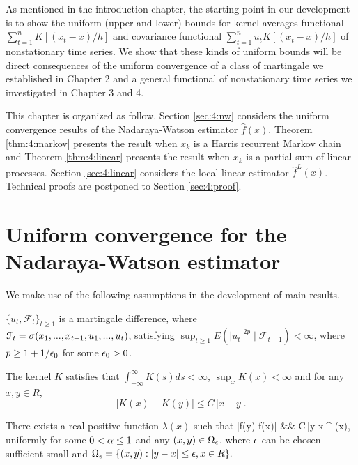 As mentioned in the introduction chapter, the starting point in our development is to show the uniform (upper and lower) bounds for kernel averages functional $\sum_{t=1}^{n}K[(x_{t}-x)/h]$ and covariance functional $\sum_{t=1}^{n}u_t K[(x_{t}-x)/h]$ of nonstationary time series. We show that these kinds of uniform bounds will be direct consequences of the uniform convergence of a class of martingale we established in Chapter 2 and a general functional of nonstationary time series we investigated in Chapter 3 and 4. 


This chapter is organized as follow. Section \ref{sec:4:nw} considers the uniform convergence results of  the Nadaraya-Watson estimator $\widehat{f}(x)$. Theorem \ref{thm:4:markov} presents the result when $x_k$ is a Harris recurrent Markov chain and Theorem \ref{thm:4:linear} presents the result when $x_k$ is a partial sum of linear processes. Section \ref{sec:4:linear} considers the local linear estimator $\widehat{f}^L(x)$. Technical proofs are postponed to Section \ref{sec:4:proof}.

\section{Uniform convergence for the Nadaraya-Watson estimator} 
We make use of the following assumptions in the development of main results.

\begin{assump} 
 $\{u_t, {\mathcal F}_t\}_{t\ge 1}$ is a martingale difference, where\\ ${\mathcal F}_t=\sigma (x_1, ..., x_{t+1}, u_1,...,u_t)$, satisfying $ \sup_{t\ge 1}E(|u_t|^{2p}\mid {\mathcal F}_{t-1})<\infty$, where  $p\ge 1+1/\epsilon_0$ for some $\epsilon_0>0$.
 \end{assump}

\begin{assump} 
The kernel $K$ satisfies that $\int_{-\infty}^{\infty}K(s)ds<\infty$, $\sup_xK(x)<\infty$
 and for any $x, y \in R$, $$ |K(x)-K(y)| \le C\, |x-y|. $$
\end{assump}

\begin{assump} 
There exists a real positive function $\lambda(x)$ such that
\bestar
|f(y)-f(x)| &\leq& C\,|y-x|^{\alpha} \lambda(x),
\eestar
uniformly for some $0<\alpha\le 1$ and  any  $(x, y)\in \Omega_\epsilon$, where $\epsilon$ can be chosen sufficient small and $ \Omega_{\epsilon} = \{(x,y): |y-x|\le \epsilon, x\in R\}. $
\end{assump}


